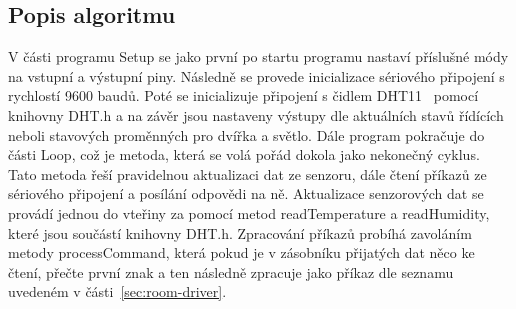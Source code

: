 \subsection*{Popis algoritmu}
V části programu Setup se jako první po startu programu nastaví příslušné módy na vstupní a výstupní piny.
Následně se provede inicializace sériového připojení s rychlostí 9600 baudů.
Poté se inicializuje připojení s čidlem DHT11~\cite{DHT11Datasheet} pomocí knihovny DHT.h a na závěr jsou nastaveny výstupy dle aktuálních stavů řídících neboli stavových proměnných pro dvířka a světlo.
Dále program pokračuje do části Loop, což je metoda, která se volá pořád dokola jako nekonečný cyklus.
Tato metoda řeší pravidelnou aktualizaci dat ze senzoru, dále čtení příkazů ze sériového připojení a posílání odpovědi na ně.
Aktualizace senzorových dat se provádí jednou do vteřiny za pomocí metod readTemperature a readHumidity, které jsou součástí knihovny DHT.h.
Zpracování příkazů probíhá zavoláním metody processCommand, která pokud je v zásobníku přijatých dat něco ke čtení, přečte první znak a ten následně zpracuje jako příkaz dle seznamu uvedeném v části~\ref{sec:room-driver}.
%




%
%
%
%